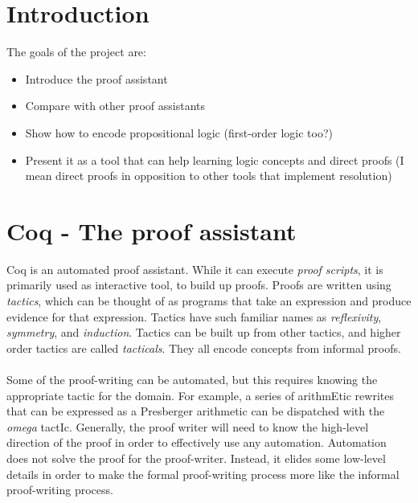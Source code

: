 \documentclass{article}
\begin{document}
\section{Introduction}

The goals of the project are:
\begin{itemize}
	\item Introduce the proof assistant 
	\item Compare with other proof assistants
	\item Show how to encode propositional logic (first-order logic too?)
	\item Present it as a tool that can help learning logic concepts and direct proofs (I mean direct proofs in opposition to other tools that implement resolution)
\end{itemize}
 
 

\section{Coq - The proof assistant}

Coq is an automated proof assistant. While it can execute \emph{proof scripts}, it is primarily used as interactive tool, to build up proofs. Proofs are written using \emph{tactics}, which can be thought of as programs that take an expression and produce evidence for that expression. Tactics have such familiar names as \emph{reflexivity}, \emph{symmetry}, and \emph{induction}. Tactics can be built up from other tactics, and higher order tactics are called \emph{tacticals}. They all encode concepts from informal proofs. 

\paragraph{}
Some of the proof-writing can be automated, but this requires knowing the appropriate tactic for the domain. For example, a series of arithmEtic rewrites that can be expressed as a Presberger arithmetic can be dispatched with the \emph{omega} tactIc. Generally, the proof writer will need to know the high-level direction of the proof in order to effectively use any automation. Automation does not solve the proof for the proof-writer. Instead, it elides some low-level details in order to make the formal proof-writing process more like the informal proof-writing process. 
\end{document}
